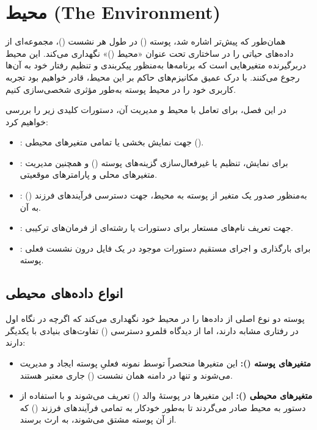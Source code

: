 \chapter{محیط (The Environment)}

همان‌طور که پیش‌تر اشاره شد، پوسته () در طول هر نشست ()، مجموعه‌ای از داده‌های حیاتی را در ساختاری تحت عنوان «محیط ()» نگهداری می‌کند. این محیط دربرگیرنده متغیرهایی است که برنامه‌ها به‌منظور پیکربندی و تنظیم رفتار خود به آن‌ها رجوع می‌کنند. با درک عمیق مکانیزم‌های حاکم بر این محیط، قادر خواهیم بود تجربه کاربری خود را در محیط پوسته به‌طور مؤثری شخصی‌سازی کنیم.

در این فصل، برای تعامل با محیط و مدیریت آن، دستورات کلیدی زیر را بررسی خواهیم کرد:

\begin{itemize}
  \item {}: جهت نمایش بخشی یا تمامی متغیرهای محیطی ().
  \item {}: برای نمایش، تنظیم یا غیرفعال‌سازی گزینه‌های پوسته () و همچنین مدیریت متغیرهای محلی و پارامترهای موقعیتی.
  \item {}: به‌منظور صدور یک متغیر از پوسته به محیط، جهت دسترسی فرآیندهای فرزند () به آن.
  \item {}: جهت تعریف نام‌های مستعار برای دستورات یا رشته‌ای از فرمان‌های ترکیبی.
  \item {}: برای بارگذاری و اجرای مستقیم دستورات موجود در یک فایل درون نشست فعلی پوسته.
\end{itemize}

\section{انواع داده‌های محیطی}

پوسته دو نوع اصلی از داده‌ها را در محیط خود نگهداری می‌کند که اگرچه در نگاه اول در  رفتاری مشابه دارند، اما از دیدگاه قلمرو دسترسی () تفاوت‌های بنیادی با یکدیگر دارند:

\begin{itemize}
  \item \textbf{متغیرهای پوسته ():} این متغیرها منحصراً توسط نمونه فعلیِ پوسته ایجاد و مدیریت می‌شوند و تنها در دامنه همان نشست () جاری معتبر هستند.
  \item \textbf{متغیرهای محیطی ():} این متغیرها در پوستهٔ والد () تعریف می‌شوند و با استفاده از دستور  به محیط صادر می‌گردند تا به‌طور خودکار به تمامی فرآیندهای فرزند () که از آن پوسته مشتق می‌شوند، به ارث برسند.
\end{itemize}

